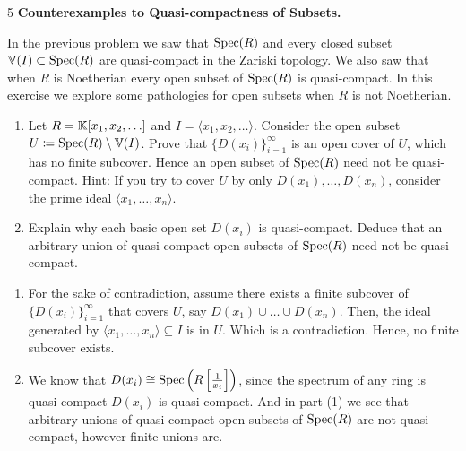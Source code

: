 \documentclass[Notebook.tex]{subfiles}
\begin{document}
\begin{problem}{5}
    \textbf{Counterexamples to Quasi-compactness of Subsets.} 
    
    In the previous problem we saw that $\operatorname{Spec}(R)$ and every closed subset $\mathbb V(I) \subset \operatorname{Spec}(R)$ are quasi-compact in the Zariski topology. We also saw that when $R$ is Noetherian every open subset of $\operatorname{Spec}(R)$ is quasi-compact. In this exercise we explore some pathologies for open subsets when $R$ is not Noetherian.
    \begin{enumerate}
        \item Let $R=\mathbb K[x_1,x_2,\ldots]$ and $I=\langle x_1,x_2,\ldots\rangle$. Consider the open subset $U\coloneqq \operatorname{Spec}(R) \setminus \mathbb V(I)$. Prove that $\{D(x_i)\}_{i=1}^{\infty}$ is an open cover of $U$, which has no finite subcover. Hence an open subset of $\operatorname{Spec}(R)$ need not be quasi-compact. Hint: If you try to cover $U$ by only $D(x_1),\ldots,D(x_n)$, consider the prime ideal $\langle x_1,\ldots,x_n\rangle$.
        \item Explain why each basic open set $D(x_i)$ is quasi-compact. Deduce that an arbitrary union of quasi-compact open subsets of $\operatorname{Spec}(R)$ need not be quasi-compact.
    \end{enumerate}
\end{problem}

\begin{solution}
    \bbni
    \begin{enumerate}
        \item For the sake of contradiction, assume there exists a finite subcover of $\{D(x_i)\}_{i=1}^{\infty}$ that covers $U$, say $D(x_1) \cup \ldots \cup D(x_n)$. Then, the ideal generated by $\langle x_1, \ldots, x_{n} \rangle \subseteq I$ is in $U$. Which is a contradiction. Hence, no finite subcover exists. 
        
        \item We know that $D(x_i) \cong \operatorname{Spec}\left(R\left[\frac{1}{x_i}\right]\right)$, since the spectrum of any ring is quasi-compact $D(x_i)$ is quasi compact. And in part (1) we see that arbitrary unions of quasi-compact open subsets of $\operatorname{Spec}(R)$ are not quasi-compact, however finite unions are. 
    \end{enumerate}
\end{solution}

\newpage
\end{document}
